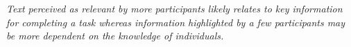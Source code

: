 



\medskip
\begin{bluequote}
    \textit{Text perceived as relevant by more participants likely relates
    to key information for completing a task whereas information
    highlighted by a few participants may be more dependent on the knowledge of individuals.}
\end{bluequote}
